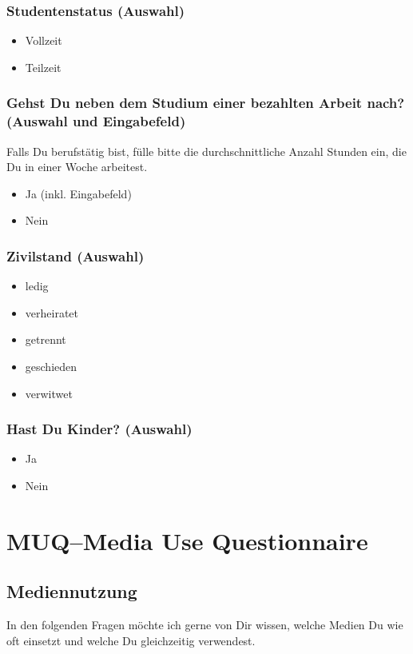 \subsubsection*{Studentenstatus (Auswahl)}
    \begin{itemize}
      \item Vollzeit
      \item Teilzeit
    \end{itemize}
\subsubsection*{Gehst Du neben dem Studium einer bezahlten Arbeit nach? (Auswahl und Eingabefeld)}
Falls Du berufstätig bist, fülle bitte die durchschnittliche Anzahl Stunden ein, die Du in einer Woche arbeitest.
    \begin{itemize}
      \item Ja (inkl. Eingabefeld)
      \item Nein
    \end{itemize}
\subsubsection*{Zivilstand (Auswahl)}
    \begin{itemize}
      \item ledig
      \item verheiratet
      \item getrennt
      \item geschieden
      \item verwitwet
    \end{itemize}
\subsubsection*{Hast Du Kinder? (Auswahl)} 
    \begin{itemize}
      \item Ja
      \item Nein
    \end{itemize}    
\section{MUQ--Media Use Questionnaire}\label{anhangSection.muq}   
\subsection*{Mediennutzung}    
In den folgenden Fragen möchte ich gerne von Dir wissen, welche Medien Du wie oft einsetzt und welche Du gleichzeitig verwendest.
